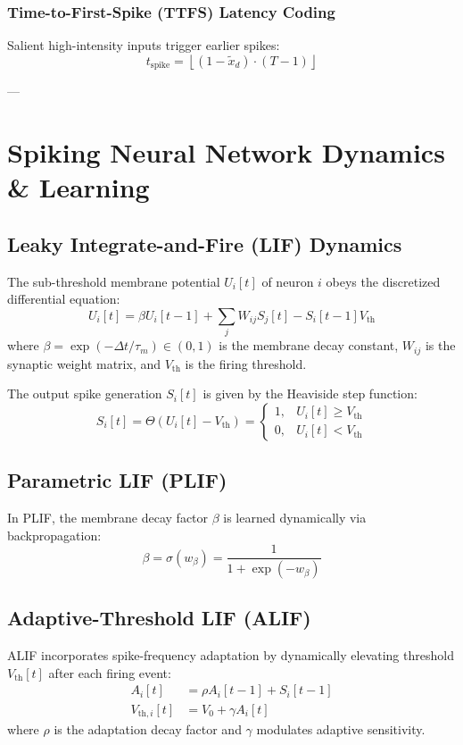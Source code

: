\documentclass[journal,compsoc]{IEEEtran}
\begin{document}
\subsubsection{Time-to-First-Spike (TTFS) Latency Coding}
Salient high-intensity inputs trigger earlier spikes:
\begin{equation}
t_{\text{spike}} = \left\lfloor (1 - \tilde{x}_d) \cdot (T - 1) \right\rfloor
\end{equation}

---

\section{Spiking Neural Network Dynamics & Learning}

\subsection{Leaky Integrate-and-Fire (LIF) Dynamics}
The sub-threshold membrane potential $U_i[t]$ of neuron $i$ obeys the discretized differential equation:
\begin{equation}
U_i[t] = \beta U_i[t-1] + \sum_{j} W_{ij} S_j[t] - S_i[t-1] V_{\text{th}}
\end{equation}
where $\beta = \exp(-\Delta t / \tau_m) \in (0, 1)$ is the membrane decay constant, $W_{ij}$ is the synaptic weight matrix, and $V_{\text{th}}$ is the firing threshold.

The output spike generation $S_i[t]$ is given by the Heaviside step function:
\begin{equation}
S_i[t] = \Theta(U_i[t] - V_{\text{th}}) = \begin{cases}
1, & U_i[t] \ge V_{\text{th}} \\
0, & U_i[t] < V_{\text{th}}
\end{cases}
\end{equation}

\subsection{Parametric LIF (PLIF)}
In PLIF, the membrane decay factor $\beta$ is learned dynamically via backpropagation:
\begin{equation}
\beta = \sigma(w_\beta) = \frac{1}{1 + \exp(-w_\beta)}
\end{equation}

\subsection{Adaptive-Threshold LIF (ALIF)}
ALIF incorporates spike-frequency adaptation by dynamically elevating threshold $V_{\text{th}}[t]$ after each firing event:
\begin{align}
A_i[t] &= \rho A_i[t-1] + S_i[t-1] \\
V_{\text{th}, i}[t] &= V_0 + \gamma A_i[t]
\end{align}
where $\rho$ is the adaptation decay factor and $\gamma$ modulates adaptive sensitivity.
\end{document}
